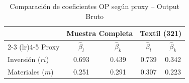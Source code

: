 \begin{table}[H]
\centering
\caption{Comparación de coeficientes OP según proxy -- Output Bruto}
\begin{tabular}{lcccc}
\toprule
 & \multicolumn{2}{c}{Muestra Completa} & \multicolumn{2}{c}{Textil (321)} \\
\cmidrule(lr){2-3} \cmidrule(lr){4-5}
Proxy & $\hat{\beta}_l$ & $\hat{\beta}_k$ & $\hat{\beta}_l$ & $\hat{\beta}_k$ \\
\midrule
Inversión ($ri$) & 0.693 & 0.439 & 0.739 & 0.342 \\
Materiales ($m$) & 0.251 & 0.291 & 0.307 & 0.223 \\
\bottomrule
\end{tabular}
\end{table}
